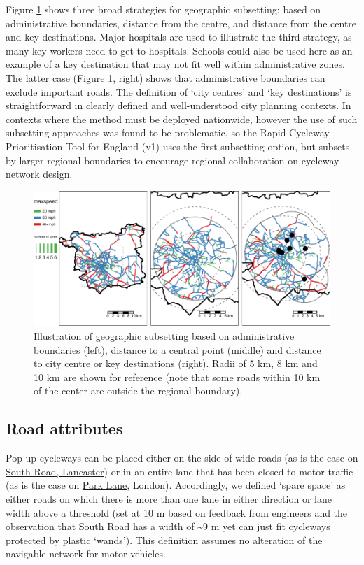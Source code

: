 \documentclass[
]{article}
\begin{document}
Figure \ref{fig:gsub} shows three broad strategies for geographic subsetting: based on administrative boundaries, distance from the centre, and distance from the centre and key destinations.
Major hospitals are used to illustrate the third strategy, as many key workers need to get to hospitals.
Schools could also be used here as an example of a key destination that may not fit well within administrative zones.
The latter case (Figure \ref{fig:gsub}, right) shows that administrative boundaries can exclude important roads.
The definition of `city centres' and `key destinations' is straightforward in clearly defined and well-understood city planning contexts.
In contexts where the method must be deployed nationwide, however the use of such subsetting approaches was found to be problematic, so the Rapid Cycleway Prioritisation Tool for England (v1) uses the first subsetting option, but subsets by larger regional boundaries to encourage regional collaboration on cycleway network design.

\begin{figure}
\includegraphics[width=1\linewidth]{article_files/figure-latex/gsub-1} \caption{Illustration of geographic subsetting based on administrative boundaries (left), distance to a central point (middle) and distance to city centre or key destinations (right). Radii of 5 km, 8 km and 10 km are shown for reference (note that some roads within 10 km of the center are outside the regional boundary).}\label{fig:gsub}
\end{figure}

\hypertarget{road-attributes}{%
\subsection{Road attributes}\label{road-attributes}}

Pop-up cycleways can be placed either on the side of wide roads (as is the case on \href{https://www.lancasterguardian.co.uk/news/uk-news/mixed-reactions-new-lancaster-pop-cycle-lanes-busy-city-centre-road-2875909}{South Road, Lancaster}) or in an entire lane that has been closed to motor traffic (as is the case on \href{https://metro.co.uk/2020/05/14/road-turns-giant-cycle-lane-make-social-distancing-easier-12703847/}{Park Lane}, London).
Accordingly, we defined `spare space' as either roads on which there is more than one lane in either direction or lane width above a threshold (set at 10 m based on feedback from engineers and the observation that South Road has a width of \textasciitilde9 m yet can just fit cycleways protected by plastic `wands').
This definition assumes no alteration of the navigable network for motor vehicles.
\end{document}
